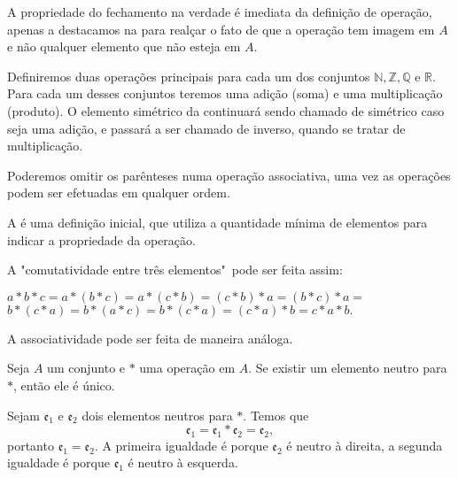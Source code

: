\documentclass[../main.tex]{subfiles}
\begin{document}
A propriedade do fechamento na verdade é imediata da definição de operação, apenas a destacamos na  para realçar o fato de que a operação tem imagem em $A$ e não qualquer elemento que não esteja em $A$.
\begin{obs}
    Definiremos duas operações principais para cada um dos conjuntos $\mathbb{N}, \mathbb{Z}, \mathbb{Q}$ e $\mathbb{R}$. Para cada um desses conjuntos teremos uma adição (soma) e uma multiplicação (produto). O elemento simétrico da  continuará sendo chamado de simétrico caso seja uma adição, e passará a ser chamado de inverso, quando se tratar de multiplicação.
\end{obs}
Poderemos omitir os parênteses numa operação associativa, uma vez as operações podem ser efetuadas em qualquer ordem.

A  é uma definição inicial, que utiliza a quantidade mínima de elementos para indicar a propriedade da operação.
\begin{ex}
    A "comutatividade entre três elementos"\ pode ser feita assim: 
    \begin{center}
        $a * b * c = a * (b*c) = a*(c*b) = (c*b)*a = (b*c)*a =$ \\
         $b*(c*a) = b*(a*c) = b*(c*a) =(c*a)*b = c * a * b.$
    \end{center}
\end{ex}



A associatividade pode ser feita de maneira análoga.

\begin{teo}\label{agb-teo-neutroUnico}
    Seja $A$ um conjunto e $*$ uma operação em $A$. Se existir um elemento neutro para $*$, então ele é único.
\end{teo}
\begin{dem}
    Sejam $\mathfrak{e_1}$ e $\mathfrak{e_2}$ dois elementos neutros para $*$. Temos que 
    \[ \mathfrak{e_1} = \mathfrak{e_1} * \mathfrak{e_2} = \mathfrak{e_2}, \] 
    portanto ${\mathfrak{e_1} = \mathfrak{e_2}}$. A primeira igualdade é porque $\mathfrak{e_2}$ é neutro à direita, a segunda igualdade é porque $\mathfrak{e_1}$ é neutro à esquerda.
\end{dem}
\end{document}
